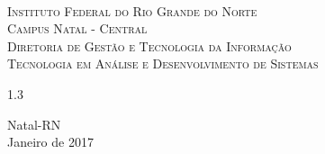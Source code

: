 
\begin{titlepage}
	\begin{center}


		\begin{minipage}{11.15cm}
			\begin{center}
				\begin{espacosimples}
					{\small \ \\
                       \textsc{Instituto Federal do Rio Grande do Norte}
                       \\
							  \textsc{Campus Natal - Central}					\\
							  \textsc{Diretoria de Gestão e Tecnologia da Informação}
							  \\
							  \textsc{Tecnologia em Análise e Desenvolvimento de Sistemas}}
                       \\
				\end{espacosimples}
			\end{center}
		\end{minipage}


		\vspace{6cm}

		{\setlength{\baselineskip}%
		{1.3\baselineskip}
		{\LARGE \textbf{\ABNTtitulodata}}\par}

		\vspace{3cm}

		{\large \textbf{\ABNTautordata}}

		\vspace{6cm}

		Natal-RN\\ Janeiro de 2017
	\end{center}
\end{titlepage}
